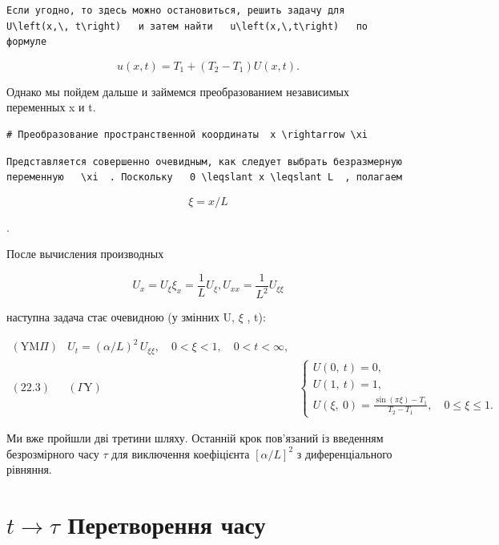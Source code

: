 \documentclass[
  ukrainian,
]{article}
\begin{document}
\begin{verbatim}
Если угодно, то здесь можно остановиться, решить задачу для   U\left(x,\, t\right)   и затем найти   u\left(x,\,t\right)   по формуле
\end{verbatim}

\[
u(x, t) = T_1 + (T_2 - T_1) U(x, t).
\]

Однако мы пойдем дальше и займемся преобразованием независимых
переменных x и t.

\begin{verbatim}
# Преобразование пространственной координаты  x \rightarrow \xi
\end{verbatim}

\begin{verbatim}
Представляется совершенно очевидным, как следует выбрать безразмерную переменную   \xi  . Поскольку   0 \leqslant x \leqslant L  , полагаем
\end{verbatim}

\[
\xi = x/L
\]

.

После вычисления производных

\[
U_x = U_{\xi} \xi_x = \frac{1}{L} U_{\xi},
U_{xx} = \frac{1}{L^2} U_{\xi\xi}
\]

наступна задача стає очевидною (у змінних U, \(\xi\) , t):

\[
\begin{array}{ll} (\text{YM}\Pi) & U_t = (\alpha/L)^2 \, U_{\xi\xi}, \quad 0 < \xi < 1, \quad 0 < t < \infty, \\ (22.3) & (\Gamma \text{Y}) & \begin{cases} U(0,\ t) = 0, \\ U(1,\ t) = 1, \\ U(\xi,\ 0) = \frac{\sin\left(\pi\xi\right) - T_1}{T_2 - T_1}, \quad 0 \leqslant \xi \leqslant 1. \end{cases} \end{array}
\]

Ми вже пройшли дві третини шляху. Останній крок пов'язаний із введенням
безрозмірного часу \(\tau\) для виключення коефіцієнта \([\alpha/L]^2\)
з диференціального рівняння.

\section{\texorpdfstring{\(t \rightarrow \tau\) Перетворення
часу}{t \textbackslash rightarrow \textbackslash tau Перетворення часу}}\label{t-rightarrow-tau-ux43fux435ux440ux435ux442ux432ux43eux440ux435ux43dux43dux44f-ux447ux430ux441ux443}
\end{document}
